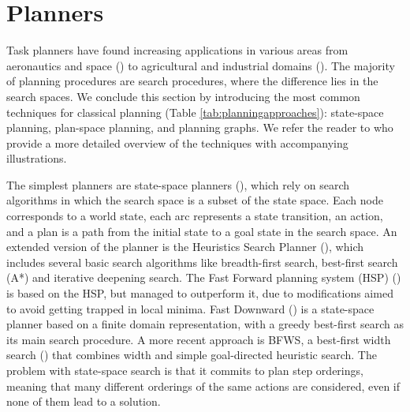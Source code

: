 \section{Planners}\label{subsec:Planners}
Task planners have found increasing applications in various areas from aeronautics and space (\cite{aarup1992optimum}) to agricultural and industrial domains (\cite{aggriculture}). 
The majority of planning procedures are search procedures, where the difference lies in the search spaces.
We conclude this section by introducing the most common techniques for classical planning (Table \ref{tab:planningapproaches}):
state-space planning, plan-space planning, and planning graphs. 
We refer the reader to \cite{nau2007current} who provide a more detailed overview of the techniques with accompanying illustrations.

The simplest planners are state-space planners (\cite{ghallab2004automated}), which rely on search algorithms in which the search space is a subset of the state space. 
Each node corresponds to a world state, each arc represents a state transition, \ie an action, and a plan is a path from the initial state to a goal state in the search space. 
An extended version of the planner is the Heuristics Search Planner (\cite{bonet:01}), which includes several basic search algorithms like breadth-first search, best-first search (\eg A*) and iterative deepening search. 
The Fast Forward planning system (HSP) (\cite{hoffmann2001ff}) is based on the HSP, but managed to outperform it, due to modifications aimed to avoid getting trapped in local minima. %
Fast Downward (\cite{helmert:06a}) is a state-space planner based on a finite domain representation, with a greedy best-first search as its main search procedure.
A more recent approach is BFWS, a best-first width search  (\cite{lipovetzky2017best}) that combines width and simple goal-directed heuristic search.
The problem with state-space search is that it commits to plan step orderings, meaning that many different orderings of the same actions are considered, even if none of them lead to a solution.

